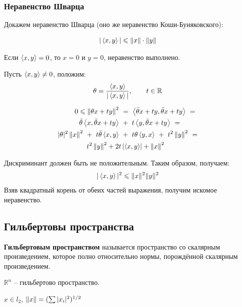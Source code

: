 \documentclass[12pt]{article}
\begin{document}
		\subsubsection{Неравенство Шварца}

			Докажем неравенство Шварца (оно же неравенство Коши-Буняковского):

			$$|\left\langle x, y \right\rangle| \leqslant \left\| x \right\| \cdot \left\| y \right\|$$


			Если $\left\langle x, y \right\rangle = 0$, то $x=0$ и $y=0$, неравенство выполнено.

			Пусть $\left\langle x, y \right\rangle \neq 0$, положим:
			$$\theta = \frac{\left\langle x, y \right\rangle}{|\left\langle x, y \right\rangle|},\qquad t \in \mathbb{R}$$

			\begin{align*}
				0 \leqslant \left\| 
				{\theta} x + t y \right\|^2 ~&=~ \left\langle \bar{\theta} x + t y, \bar{\theta} x + t y \right\rangle ~= \\
				\bar{\theta} \left\langle x, \bar{\theta} x + t y \right\rangle ~&+~ t \left\langle y, \bar{\theta} x + t y \right\rangle ~= \\
				|\theta|^2 \left\| x \right\|^2 ~+~ t \bar{\theta} \left\langle x, y \right\rangle ~&+~ t \theta \left\langle y, x \right\rangle ~+~ t^2 \left\| y \right\|^2 ~= \\
				t^2 \left\| y \right\|^2 + 2t &\left| \left\langle x, y \right\rangle \right| + \left\| x \right\|^2
			\end{align*}

			Дискриминант должен быть не положительным. Таким образом, получаем:
			$$|\left\langle x, y \right\rangle|^2 \leqslant \|x\|^2 \|y\|^2$$
			Взяв квадратный корень от обеих частей выражения, получим искомое неравенство.

	\subsection{Гильбертовы пространства}

		\begin{defi}
			\textbf{Гильбертовым пространством} называется пространство со скалярным произведением, которое полно относительно нормы, 
			порождённой  скалярным произведением.
		\end{defi}
	
		\example $\mathbb{R}^n$ -- гильбертово пространство.
	
		\begin{defi}
			$x \in l_2$, $\left\| x \right\| = (\sum{|x_i|^2})^{1/2}$ 
		\end{defi}
\end{document}
